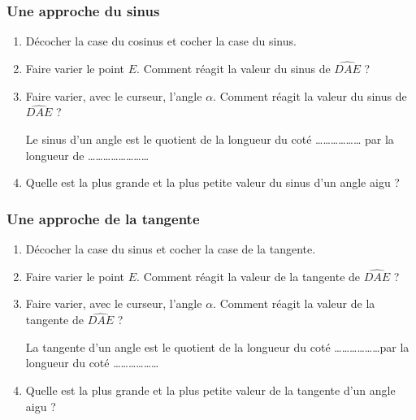 \subsubsection{Une approche du sinus}


\begin{enumerate}
\item Décocher la case du cosinus et cocher la case du sinus.
\item Faire varier le point $E$. Comment réagit la valeur du sinus de $\widehat{DAE}$ ? 
\item Faire varier, avec le curseur, l'angle $\alpha$. Comment réagit la valeur du sinus de $\widehat{DAE}$ ? 
\begin{Conjecture}

Le sinus d'un angle est le quotient de la longueur du coté \ldots\ldots\ldots\ldots\ldots\ldots
par la longueur de  \ldots\ldots\ldots\ldots\ldots\ldots\ldots\ldots
\end{Conjecture}

\item Quelle est la plus grande et la plus petite valeur du sinus d'un angle aigu ? 
\end{enumerate}


\subsubsection{Une approche de la tangente}


\begin{enumerate}

\item Décocher la case du sinus et cocher la case de la tangente.
\item Faire varier le point $E$. Comment réagit la valeur de la tangente de $\widehat{DAE}$ ? 
\item Faire varier, avec le curseur, l'angle $\alpha$. Comment réagit la valeur de la tangente de $\widehat{DAE}$ ? 


\begin{Conjecture}
La tangente  d'un angle est le quotient de la longueur du coté \ldots\ldots\ldots\ldots\ldots\ldots par  la longueur du coté \ldots\ldots\ldots\ldots\ldots\ldots 
\end{Conjecture}


\item Quelle est la plus grande et la plus petite valeur de la tangente d'un angle aigu ? 
\end{enumerate}

